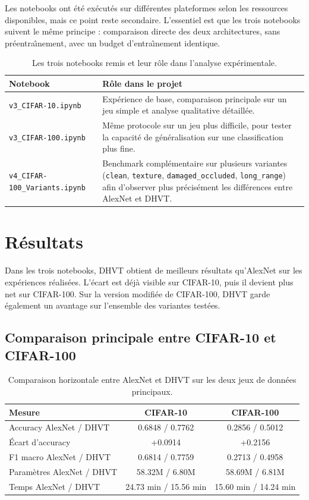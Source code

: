 \documentclass[11pt,a4paper]{article}
\begin{document}
Les notebooks ont \'et\'e ex\'ecut\'es sur diff\'erentes plateformes selon les ressources disponibles, mais ce point reste secondaire. L'essentiel est que les trois notebooks suivent le m\^eme principe : comparaison directe des deux architectures, sans pr\'eentra\^\i nement, avec un budget d'entra\^\i nement identique.

\begin{table}[H]
\centering
\begin{tabular}{p{5.5cm}p{10cm}}
\toprule
Notebook & R\^ole dans le projet \\
\midrule
\texttt{v3\_CIFAR-10.ipynb} & Exp\'erience de base, comparaison principale sur un jeu simple et analyse qualitative d\'etaill\'ee. \\
\texttt{v3\_CIFAR-100.ipynb} & M\^eme protocole sur un jeu plus difficile, pour tester la capacit\'e de g\'en\'eralisation sur une classification plus fine. \\
\texttt{v4\_CIFAR-100\_Variants.ipynb} & Benchmark compl\'ementaire sur plusieurs variantes (\texttt{clean}, \texttt{texture}, \texttt{damaged\_occluded}, \texttt{long\_range}) afin d'observer plus pr\'ecis\'ement les diff\'erences entre AlexNet et DHVT. \\
\bottomrule
\end{tabular}
\caption{Les trois notebooks remis et leur r\^ole dans l'analyse exp\'erimentale.}
\label{tab:notebooks_summary}
\end{table}

\section{R\'esultats}
Dans les trois notebooks, DHVT obtient de meilleurs r\'esultats qu'AlexNet sur les exp\'eriences r\'ealis\'ees. L'\'ecart est d\'ej\`a visible sur CIFAR-10, puis il devient plus net sur CIFAR-100. Sur la version modifi\'ee de CIFAR-100, DHVT garde \'egalement un avantage sur l'ensemble des variantes test\'ees.

\subsection{Comparaison principale entre CIFAR-10 et CIFAR-100}
\begin{table}[H]
\centering
\begin{tabular}{>{\raggedright\arraybackslash}p{5.5cm}cc}
\toprule
Mesure & CIFAR-10 & CIFAR-100 \\
\midrule
Accuracy AlexNet / DHVT & 0.6848 / 0.7762 & 0.2856 / 0.5012 \\
\'Ecart d'accuracy & +0.0914 & +0.2156 \\
F1 macro AlexNet / DHVT & 0.6814 / 0.7759 & 0.2713 / 0.4958 \\
Param\`etres AlexNet / DHVT & 58.32M / 6.80M & 58.69M / 6.81M \\
Temps AlexNet / DHVT & 24.73 min / 15.56 min & 15.60 min / 14.24 min \\
\bottomrule
\end{tabular}
\caption{Comparaison horizontale entre AlexNet et DHVT sur les deux jeux de donn\'ees principaux.}
\label{tab:cross_dataset_results}
\end{table}
\end{document}
